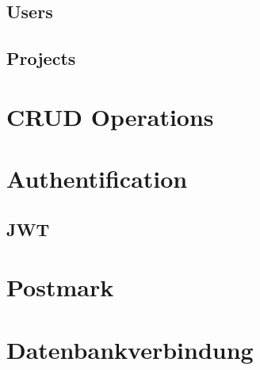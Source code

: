 \subsection{Users}


\subsection{Projects}


\section{CRUD Operations}


\section{Authentification}


\subsection{JWT}


\section{Postmark}


\section{Datenbankverbindung}
